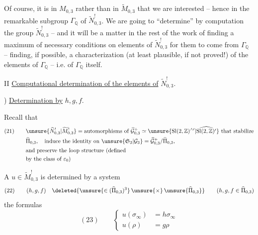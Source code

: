 Of course, it is in $M_{0,3}$  rather than in $\widetilde M_{0,3}$  that we are interested -- hence in the remarkable subgroup $\Gamma_{\mathbb Q}$ of $\widetilde N_{0,3}^{!}$. We are going to ``determine'' by computation the group $\widetilde N_{0,3}^{!}$ -- and it will be a matter in the rest of the work of finding a maximum of necessary conditions on elements of $\widetilde N_{0,3}^{!}$ for them to come from $\Gamma_{\mathbb Q}$ --  finding, if possible, a characterization (at least plausible, if not proved!) of the elements of $\Gamma_{\mathbb Q}$ -- i.e. of $\Gamma_{\mathbb Q}$ itself.


II \uline{Computational determination of the elements of} $\widetilde N_{0,3}^{!}$.\par{}) \uline{Determination by} $h,g,f$.


Recall that
\[
\begin{aligned}
(21)\qquad
&\unsure{\widetilde N_{0,3}^{!}|\widetilde M_{0,3}^{!}}
=\text{automorphisms of }\widehat{\mathcal G}_{0,3}^{+}
\simeq\unsure{\mathrm{Sl}(2,\mathbb Z)^{\wedge\prime}|\widehat{\mathrm{Sl}(2,\mathbb Z)^{\prime}}}
\text{ that stabilize}\\
&\widehat\Pi_{0,3},\quad\text{induce the identity on }
\unsure{\mathfrak S_3|\mathcal G_3}
=\widehat{\mathcal G}_{0,3}^{+}/\widehat\Pi_{0,3},\\
&\text{and preserve the loop structure (defined}\\
&\text{by the class of }\varepsilon_0\text{)}
\end{aligned}
\]

A $u\in\widetilde M_{0,3}^{!}$ is determined by a system
\[
(22)\qquad (h,g,f)\quad
\deleted{\unsure{\in(\widehat{\Pi}_{0,3})^{3}}\,\unsure{\times}\,\unsure{\widehat{\Pi}_{0,3}}}
\qquad(h,g,f\in\widehat\Pi_{0,3})
\]
 the formulas
\[
(23)\qquad
\left\{\begin{aligned}
u(\sigma_\infty)&=h\sigma_\infty\\
u(\rho)&=g\rho
\end{aligned}\right.
\]

